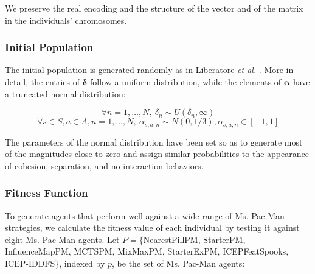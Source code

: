 \documentclass[journal]{IEEEtran}
\begin{document}
We preserve the real encoding and the structure of the vector and of the matrix in the individuals' chromosomes.

\subsubsection{Initial Population}
The initial population is generated randomly as in Liberatore \emph{et al.} \cite{Liberatore2014}. More in detail, the entries of $\boldsymbol\delta$ follow a uniform distribution, while the elements of $\boldsymbol\alpha$ have a truncated normal distribution:

\begin{small}
\begin{equation}
	\label{eq:init_radius}
	\forall n = 1, \ldots, N, \: \delta_n \sim U(\delta_n,\infty)
\end{equation}
\begin{equation}
	\label{eq:init_magnitude}
	\forall s \in S, a \in A,  n = 1, \ldots, N, \: \alpha_{s,a,n} \sim N(0,1/3), \alpha_{s,a,n} \in [-1,1]
\end{equation}
\end{small}

The parameters of the normal distribution have been set so as to generate most of the magnitudes close to zero and assign similar probabilities to the appearance of cohesion, separation, and no interaction behaviors.

\subsubsection{Fitness Function}
To generate agents that perform well against a wide range of Ms. Pac-Man strategies, we calculate the fitness value of each individual by testing it against eight Ms. Pac-Man agents. Let $P=\{$NearestPillPM, StarterPM, InfluenceMapPM, MCTSPM, MixMaxPM, StarterExPM, ICEPFeatSpooks, ICEP-IDDFS$\}$, indexed by $p$, be the set of Ms. Pac-Man agents:
\end{document}
